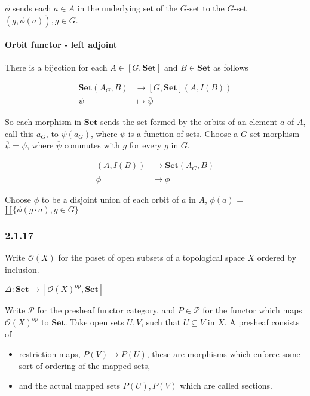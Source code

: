 \documentclass{article}
\begin{document}
$\phi$ sends each $a \in A$ in the underlying set of the $G$-set to the $G$-set $(g, \overline{\phi}(a)), g \in G$.

\paragraph{Orbit functor - left adjoint}

There is a bijection for each $A \in [G, \mathbf{Set}]$ and $B \in \mathbf{Set}$ as follows

\begin{align*}
  \mathbf{Set}(A_G, B) &\rightarrow [G, \mathbf{Set}](A, I(B)) \\
  \psi &\mapsto \overline{\psi}
\end{align*}

So each morphism in $\mathbf{Set}$ sends the set formed by the orbits of an element $a$ of $A$, call this $a_G$, to $\psi(a_G)$, where $\psi$ is a function of sets.
Choose a $G$-set morphism $\overline{\psi} = \psi$, where $\overline{\psi}$ commutes with $g$ for every $g$ in $G$.

\begin{align*}
  [G, \mathbf{Set}](A, I(B)) &\rightarrow \mathbf{Set}(A_G, B)\\
  \phi &\mapsto \overline{\phi}
\end{align*}

Choose $\overline{\phi}$ to be a disjoint union of each orbit of $a$ in $A$, $\overline{\phi}(a)$ =  $\amalg\{\phi(g \cdot a), g \in G\}$

\subsubsection*{2.1.17}

Write $\mathcal{O}(X)$ for the poset of open subsets of a topological space $X$ ordered by inclusion.

$\Delta: \mathbf{Set} \rightarrow [\mathcal{O}(X)^{op}, \mathbf{Set}]$

Write $\mathcal{P}$ for the presheaf functor category, and $P \in \mathcal{P}$ for the functor which maps $\mathcal{O}(X)^{op}$ to $\mathbf{Set}$. Take open sets $U, V$, such that $U \subseteq V$ in $X$. A presheaf consists of

\begin{itemize}

\item restriction maps, $P(V) \rightarrow P(U)$, these are morphisms which enforce some sort of ordering of the mapped sets,

\item and the actual mapped sets $P(U), P(V)$ which are called sections.

\end{itemize}
\end{document}
